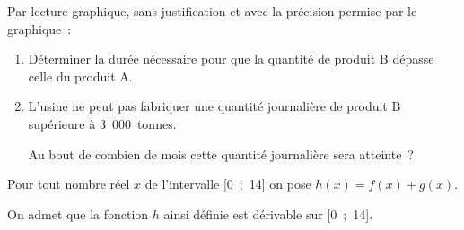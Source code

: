           \medbreak
          Par lecture graphique, sans justification et avec la précision permise par le graphique~:
          \medbreak
          \begin{enumerate}
               \item Déterminer la durée nécessaire pour que la quantité de produit B dépasse celle du produit A.
               \item L'usine ne peut pas fabriquer une quantité journalière de produit B supérieure à 3~000~tonnes.
               \par
               Au bout de combien de mois cette quantité journalière sera atteinte~?
          \end{enumerate}
          \bigbreak
          \medbreak
          Pour tout nombre réel $x$ de l'intervalle [0~;~14] on pose $h(x) = f(x) + g(x)$.
          \par
          On admet que la fonction $h$ ainsi définie est dérivable sur [0~;~14].
          \medbreak
